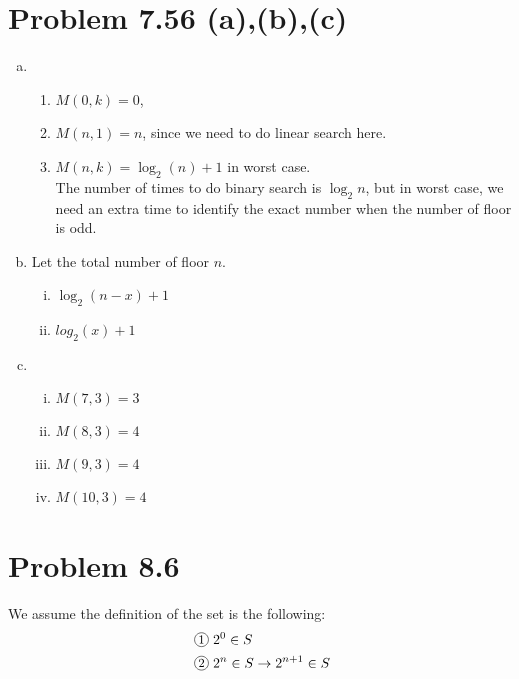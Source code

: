 \documentclass{article}
\newcommand*{\circled}[1]{\lower.7ex\hbox{\tikz\draw (0pt, 0pt)%
    circle (.5em) node {\makebox[1em][c]{\small #1}};}}
\def\math#1{$#1$}
\begin{document}
\section{Problem 7.56 (a),(b),(c)}
\begin{enumerate}[(a)]
    \item \begin{enumerate}[(1)]
            \item \math{M(0, k) = 0}, 
            \item \math{M(n, 1) = n}, since we need to do linear search here.
            \item \math{M(n ,k) = {\log_2 (n)} + 1} in worst case. \\ The number of times to do binary search is \math{\log_2 n}, but in worst case, we need an extra time to identify the exact number when the number of floor is odd.
        \end{enumerate}
    \item Let the total number of floor \math{n}.
        \begin{enumerate}[i)]
            \item \math{\log_2 (n - x) + 1}
            \item \math{log_2 (x) + 1}
        \end{enumerate}
    \item \begin{enumerate}[i)]
        \item \math{M(7, 3) = 3}
        \item \math{M(8, 3) = 4}
        \item \math{M(9, 3) = 4}
        \item \math{M(10, 3) = 4}
    \end{enumerate}
\end{enumerate}


\section{Problem 8.6}

We assume the definition of the set is the following: \\

\begin{align*}
    \circled{1} & 2^0 \in S \\
    \circled{2} & 2^n \in S \to 2^{n+1} \in S
\end{align*}
\end{document}
